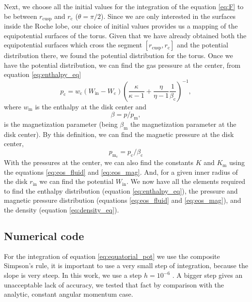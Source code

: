 \documentclass{aa}
\begin{document}
Next, we choose all the initial values for the integration of the equation \eqref{eq:F} to be between $r_{\mathrm{cusp}}$ and $r_{\mathrm{c}}$ ($\theta = \pi / 2$). Since we are only interested in the surfaces inside the Roche lobe, our choice of initial values provides us a mapping of the equipotential surfaces of the torus. Given that we have already obtained both the equipotential surfaces which cross the segment $[r_{\mathrm{cusp}}, r_{\mathrm{c}}]$ and the potential distribution there, we found the potential distribution for the torus.
Once we have the potential distribution, we can find the gas pressure at the center, from equation \eqref{eq:enthalpy_eq}
\begin{equation}
p_{\mathrm{c}} = w_{\mathrm{c}}(W_{\mathrm{in}} - W_{\mathrm{c}})\left(\frac{\kappa}{\kappa - 1} + \frac{\eta}{\eta - 1}\frac{1}{\beta_{\mathrm{c}}}\right)^{-1},
\end{equation}
where $w_{\mathrm{m}}$ is the enthalpy at the disk center and
\begin{equation}\label{eq:beta_eq}
\beta = p/p_{\mathrm{m}},
\end{equation}
is the magnetization parameter (being $\beta_{\mathrm{m}}$ the magnetization parameter at the disk center). By this definition, we can find the magnetic pressure at the disk center,
\begin{equation}
p_{\mathrm{m_{\mathrm{c}}}} = p_{\mathrm{c}}/\beta_{\mathrm{c}}
\end{equation}
With the pressures at the center, we can also find the constants $K$ and $K_{\mathrm{m}}$ using the equations \eqref{eq:eos_fluid} and \eqref{eq:eos_mag}. And, for a given inner radius of the disk $r_{\mathrm{in}}$ we can find the potential $W_{\mathrm{in}}$. We now have all the elements required to find the enthalpy distribution (equation \eqref{eq:enthalpy_eq}), the pressure and magnetic pressure distribution (equations \eqref{eq:eos_fluid} and \eqref{eq:eos_mag}), and the density (equation \eqref{eq:density_eq}).

\subsection{Numerical code}

For the integration of equation \eqref{eq:equatorial_pot} we use the composite Simpson's rule, it is important to use a very small step of integration, because the slope is very steep. In this work, we use a step $h = 10^{-6}$ . A bigger step gives an unacceptable lack of accuracy, we tested that fact by comparison with the analytic, constant angular momentum case.
\end{document}
